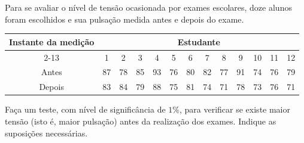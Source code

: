 %
%


\begin{exercicioBanco}[\valorquestao]
    Para se avaliar o nível de tensão ocasionada por exames escolares, doze alunos foram escolhidos e sua pulsação medida antes e depois do exame.

    \begin{center}
    \begin{tabular}{|c|cccccccccccc|}
        \hline
        \multirow{2}{*}{Instante da medição} & \multicolumn{12}{c|}{Estudante} \\
        \cline{2-13}
        & 1 & 2 & 3 & 4 & 5 & 6 & 7 & 8 & 9 & 10 & 11 & 12 \\
        \hline
        Antes  & 87 & 78 & 85 & 93 & 76 & 80 & 82 & 77 & 91 & 74 & 76 & 79 \\
        Depois & 83 & 84 & 79 & 88 & 75 & 81 & 74 & 71 & 78 & 73 & 76 & 71 \\
        \hline
    \end{tabular}
    \end{center}

    Faça um teste, com nível de significância de \(1\%\), para verificar se existe maior tensão (isto é, maior pulsação) antes da realização dos exames. Indique as suposições necessárias.
\end{exercicioBanco}

